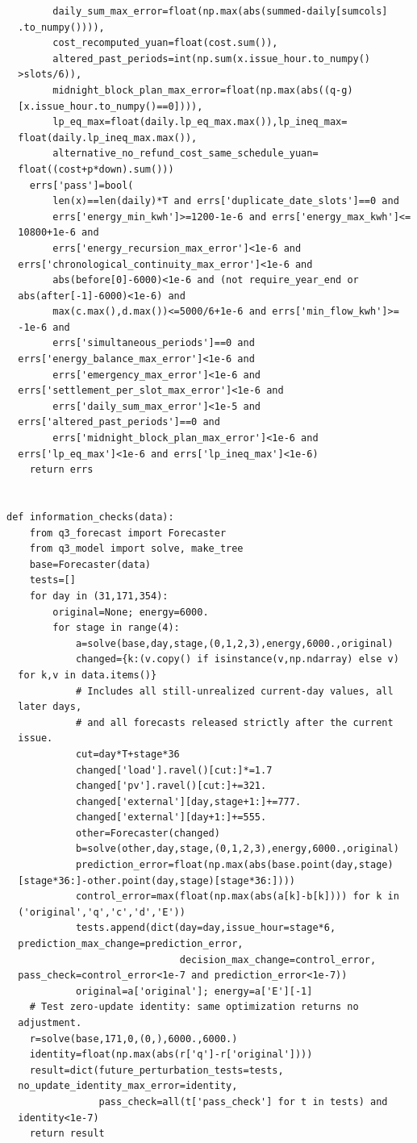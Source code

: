 \begin{verbatim}
        daily_sum_max_error=float(np.max(abs(summed-daily[sumcols]
  .to_numpy()))),
        cost_recomputed_yuan=float(cost.sum()),
        altered_past_periods=int(np.sum(x.issue_hour.to_numpy()
  >slots/6)),
        midnight_block_plan_max_error=float(np.max(abs((q-g)
  [x.issue_hour.to_numpy()==0]))),
        lp_eq_max=float(daily.lp_eq_max.max()),lp_ineq_max=
  float(daily.lp_ineq_max.max()),
        alternative_no_refund_cost_same_schedule_yuan=
  float((cost+p*down).sum()))
    errs['pass']=bool(
        len(x)==len(daily)*T and errs['duplicate_date_slots']==0 and
        errs['energy_min_kwh']>=1200-1e-6 and errs['energy_max_kwh']<=
  10800+1e-6 and
        errs['energy_recursion_max_error']<1e-6 and
  errs['chronological_continuity_max_error']<1e-6 and
        abs(before[0]-6000)<1e-6 and (not require_year_end or
  abs(after[-1]-6000)<1e-6) and
        max(c.max(),d.max())<=5000/6+1e-6 and errs['min_flow_kwh']>=
  -1e-6 and
        errs['simultaneous_periods']==0 and
  errs['energy_balance_max_error']<1e-6 and
        errs['emergency_max_error']<1e-6 and
  errs['settlement_per_slot_max_error']<1e-6 and
        errs['daily_sum_max_error']<1e-5 and
  errs['altered_past_periods']==0 and
        errs['midnight_block_plan_max_error']<1e-6 and
  errs['lp_eq_max']<1e-6 and errs['lp_ineq_max']<1e-6)
    return errs


def information_checks(data):
    from q3_forecast import Forecaster
    from q3_model import solve, make_tree
    base=Forecaster(data)
    tests=[]
    for day in (31,171,354):
        original=None; energy=6000.
        for stage in range(4):
            a=solve(base,day,stage,(0,1,2,3),energy,6000.,original)
            changed={k:(v.copy() if isinstance(v,np.ndarray) else v)
  for k,v in data.items()}
            # Includes all still-unrealized current-day values, all
  later days,
            # and all forecasts released strictly after the current
  issue.
            cut=day*T+stage*36
            changed['load'].ravel()[cut:]*=1.7
            changed['pv'].ravel()[cut:]+=321.
            changed['external'][day,stage+1:]+=777.
            changed['external'][day+1:]+=555.
            other=Forecaster(changed)
            b=solve(other,day,stage,(0,1,2,3),energy,6000.,original)
            prediction_error=float(np.max(abs(base.point(day,stage)
  [stage*36:]-other.point(day,stage)[stage*36:])))
            control_error=max(float(np.max(abs(a[k]-b[k]))) for k in
  ('original','q','c','d','E'))
            tests.append(dict(day=day,issue_hour=stage*6,
  prediction_max_change=prediction_error,
                              decision_max_change=control_error,
  pass_check=control_error<1e-7 and prediction_error<1e-7))
            original=a['original']; energy=a['E'][-1]
    # Test zero-update identity: same optimization returns no
  adjustment.
    r=solve(base,171,0,(0,),6000.,6000.)
    identity=float(np.max(abs(r['q']-r['original'])))
    result=dict(future_perturbation_tests=tests,
  no_update_identity_max_error=identity,
                pass_check=all(t['pass_check'] for t in tests) and
  identity<1e-7)
    return result



\end{verbatim}

